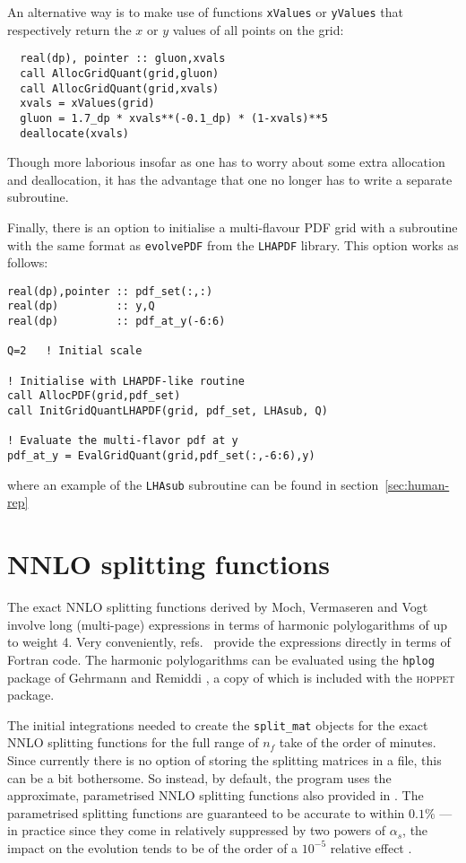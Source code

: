 \documentclass[12pt]{article}
\newcommand{\as}{\alpha_s}
\newcommand{\hoppet}{\textsc{hoppet}\xspace}
\newcommand{\ttt}[1]{\texttt{#1}}
\begin{document}
An alternative way is to
make use of functions \texttt{xValues} or \texttt{yValues} that
respectively return the $x$ or $y$ values of all points on the grid:
\begin{lstlisting}
  real(dp), pointer :: gluon,xvals
  call AllocGridQuant(grid,gluon)
  call AllocGridQuant(grid,xvals)
  xvals = xValues(grid)
  gluon = 1.7_dp * xvals**(-0.1_dp) * (1-xvals)**5 
  deallocate(xvals)
\end{lstlisting}
Though more laborious insofar as one has to worry about some extra
allocation and deallocation, it has the advantage that one no longer
has to write a separate subroutine.

Finally, there is an option to initialise a multi-flavour
PDF grid with a subroutine with the same format as
\ttt{evolvePDF} from the \ttt{LHAPDF} library. This
option works as follows:

\begin{lstlisting}
real(dp),pointer :: pdf_set(:,:)
real(dp)         :: y,Q
real(dp)         :: pdf_at_y(-6:6)

Q=2   ! Initial scale

! Initialise with LHAPDF-like routine
call AllocPDF(grid,pdf_set)
call InitGridQuantLHAPDF(grid, pdf_set, LHAsub, Q)

! Evaluate the multi-flavor pdf at y
pdf_at_y = EvalGridQuant(grid,pdf_set(:,-6:6),y)

\end{lstlisting}
where an example of  the \ttt{LHAsub} subroutine can be found in
section~\ref{sec:human-rep}

\section{NNLO splitting functions}
\label{sect:nnlo}
The exact NNLO splitting
functions derived by Moch, Vermaseren and Vogt
\cite{NNLO-NS,NNLO-singlet} involve long (multi-page) expressions in
terms of harmonic polylogarithms of up to weight 4. Very conveniently,
refs.~\cite{NNLO-NS,NNLO-singlet} provide the expressions directly in
terms of Fortran code.
%
The harmonic polylogarithms can be evaluated using the \ttt{hplog}
package of Gehrmann and Remiddi \cite{FortranPolyLog}, a copy of which
is included with the \hoppet package. 

The initial integrations needed to create the \ttt{split\_mat} objects
for the exact NNLO splitting functions for the full range of $n_f$
take of the order of minutes.  Since currently there is no option of
storing the splitting matrices in a file, this can be a bit
bothersome. So instead, by default, the program uses the approximate,
parametrised NNLO splitting functions also provided in
\cite{NNLO-NS,NNLO-singlet}. The parametrised splitting functions are
guaranteed to be accurate to within $0.1\%$ --- in practice since they
come in relatively suppressed by two powers of $\as$, the impact on
the evolution tends to be of the order of a  $10^{-5}$ relative effect
\cite{Benchmarks}.
\end{document}
